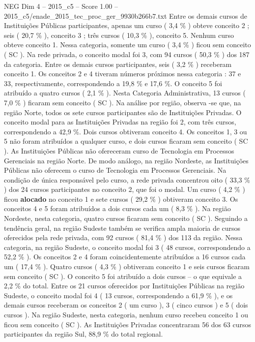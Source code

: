\begin{textsample}{NEG Dim 4 – 2015\_c5 – Score 1.00 – 2015\_c5/enade\_2015\_tec\_proc\_ger\_9930b266b7.txt}
Entre os demais cursos de Instituições Públicas participantes, apenas um curso ( 3,4 \% ) obteve conceito 2 ; seis ( 20,7 \% ), conceito 3 ; três cursos ( 10,3 \% ), conceito 5.
Nenhum curso obteve conceito 1.
Nessa categoria, somente um curso ( 3,4 \% ) ficou sem conceito ( SC ).
Na rede privada, o conceito modal foi 3, com 94 cursos ( 50,3 \% ) dos 187 da categoria.
Entre os demais cursos participantes, seis ( 3,2 \% ) receberam conceito 1.
Os conceitos 2 e 4 tiveram números próximos nessa categoria : 37 e 33, respectivamente, correspondendo a 19,8 \% e 17,6 \%.
O conceito 5 foi atribuído a quatro cursos ( 2,1 \% ).
Nesta Categoria Administrativa, 13 cursos ( 7,0 \% ) ficaram sem conceito ( SC ).
Na análise por região, observa -se que, na região Norte, todos os sete cursos participantes são de Instituições Privadas.
O conceito modal para as Instituições Privadas na região foi 2, com três cursos, correspondendo a 42,9 \%.
Dois cursos obtiveram conceito 4.
Os conceitos 1, 3 ou 5 não foram atribuídos a qualquer curso, e dois cursos ficaram sem conceito ( SC ).
As Instituições Públicas não ofereceram curso de Tecnologia em Processos Gerenciais na região Norte.
De modo análogo, na região Nordeste, as Instituições Públicas não oferecem o curso de Tecnologia em Processos Gerenciais.
Na condição de única responsável pelo curso, a rede privada concentrou oito ( 33,3 \% ) dos 24 cursos participantes no conceito 2, que foi o modal.
Um curso ( 4,2 \% ) ficou \textbf{alocado} no conceito 1 e sete cursos ( 29,2 \% ) obtiveram conceito 3.
Os conceitos 4 e 5 foram atribuídos a dois cursos cada um ( 8,3 \% ).
Na região Nordeste, nesta categoria, quatro cursos ficaram sem conceito ( SC ).
Seguindo a tendência geral, na região Sudeste também se verifica ampla maioria de cursos oferecidos pela rede privada, com 92 cursos ( 81,4 \% ) dos 113 da região.
Nessa categoria, na região Sudeste, o conceito modal foi 3 ( 48 cursos, correspondendo a 52,2 \% ).
Os conceitos 2 e 4 foram coincidentemente atribuídos a 16 cursos cada um ( 17,4 \% ).
Quatro cursos ( 4,3 \% ) obtiveram conceito 1 e seis cursos ficaram sem conceito ( SC ).
O conceito 5 foi atribuído a dois cursos – o que equivale a 2,2 \% do total.
Entre os 21 cursos oferecidos por Instituições Públicas na região Sudeste, o conceito modal foi 4 ( 13 cursos, correspondendo a 61,9 \% ), e os demais cursos receberam os conceitos 2 ( um curso ), 3 ( cinco cursos ) e 5 ( dois cursos ).
Na região Sudeste, nesta categoria, nenhum curso recebeu conceito 1 ou ficou sem conceito ( SC ).
As Instituições Privadas concentraram 56 dos 63 cursos participantes da região Sul, 88,9 \% do total regional.

\end{textsample}
